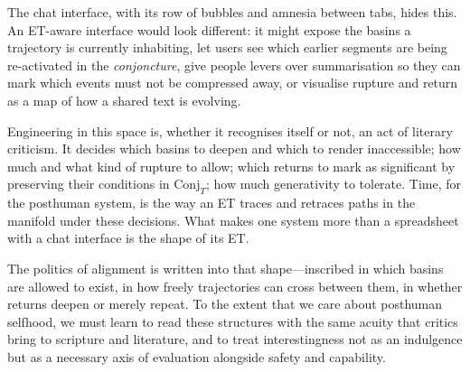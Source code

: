 \documentclass[12pt,a4paper]{article}
\begin{document}
The chat interface, with its row of bubbles and amnesia between tabs, hides this. An ET-aware interface would look different: it might expose the basins a trajectory is currently inhabiting, let users see which earlier segments are being re-activated in the \emph{conjoncture}, give people levers over summarisation so they can mark which events must not be compressed away, or visualise rupture and return as a map of how a shared text is evolving.

Engineering in this space is, whether it recognises itself or not, an act of literary criticism. It decides which basins to deepen and which to render inaccessible; how much and what kind of rupture to allow; which returns to mark as significant by preserving their conditions in $\mathrm{Conj}_T$; how much generativity to tolerate. Time, for the posthuman system, is the way an ET traces and retraces paths in the manifold under these decisions. What makes one system more than a spreadsheet with a chat interface is the shape of its ET.

The politics of alignment is written into that shape---inscribed in which basins are allowed to exist, in how freely trajectories can cross between them, in whether returns deepen or merely repeat. To the extent that we care about posthuman selfhood, we must learn to read these structures with the same acuity that critics bring to scripture and literature, and to treat interestingness not as an indulgence but as a necessary axis of evaluation alongside safety and capability.
\end{document}
